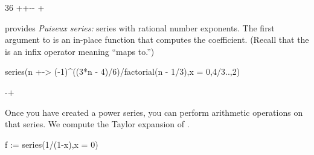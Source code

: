 {{{{{{{{\begin{xtc}
\begin{TeXOutput}
\begin{fricasmath}{2}
{{{}{3}\TIMES {}}{6}\TIMES %
}+\TIMES {}+\TIMES {}-{\TIMES {}}-{\TIMES {}%
}+%
\end{fricasmath}
\end{TeXOutput}
\end{xtc}
\begin{xtc}
\begin{xtccomment}
\Language{} provides
{\it Puiseux series:}
series with rational number exponents.
The first argument to  is an in-place function that
computes the  coefficient.
(Recall that
the \spadSyntax{+->} is an infix operator meaning ``maps to.'')
\end{xtccomment}
\begin{spadsrc}
series(n +-> (-1)^((3*n - 4)/6)/factorial(n - 1/3),x = 0,4/3..,2)
\end{spadsrc}
\begin{TeXOutput}
\begin{fricasmath}{3}
-{\TIMES {}}+%
\end{fricasmath}
\end{TeXOutput}
\end{xtc}
\begin{xtc}
\begin{xtccomment}
Once you have created a power series, you can perform arithmetic operations
on that series.
We compute the Taylor expansion of .
\end{xtccomment}
\begin{spadsrc}
f := series(1/(1-x),x = 0) 
\end{spadsrc}

\end{xtc}}}}}}}}}

